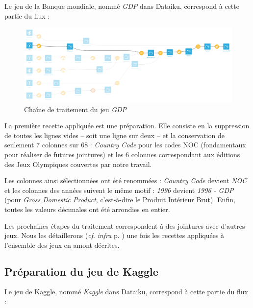 \documentclass[hidelinks, 12pt]{report}
\begin{document}
Le jeu de la Banque mondiale, nommé \textit{GDP} dans Dataiku, correspond à cette partie du flux :

\begin{center}
	\begin{figure}[H]
		\setlength{\belowcaptionskip}{-35pt}
		\includegraphics[scale=0.35]{images/flow-medals-gdp.png}
		\caption{Chaîne de traitement du jeu \textit{GDP}}
	\end{figure}
\end{center}

La première recette appliquée est une préparation. Elle consiste en la suppression de toutes les lignes vides -- soit une ligne sur deux -- et la conservation de seulement 7 colonnes sur 68 : \textit{Country Code} pour les codes NOC (fondamentaux pour réaliser de futures jointures) et les 6 colonnes correspondant aux éditions des Jeux Olympiques couvertes par notre travail.

Les colonnes ainsi sélectionnées ont été renommées : \textit{Country Code} devient \textit{NOC} et les colonnes des années suivent le même motif : \textit{1996} devient \textit{1996 - GDP} (pour \textit{Gross Domestic Product}, c'est-à-dire le Produit Intérieur Brut). Enfin, toutes les valeurs décimales ont été arrondies en entier.

Les prochaines étapes du traitement correspondent à des jointures avec d'autres jeux. Nous les détaillerons (\textit{cf}. \textit{infra} p. \pageref{join}) une fois les recettes appliquées à l'ensemble des jeux en amont décrites.





%





\subsection{Préparation du jeu de Kaggle}

Le jeu de Kaggle, nommé \textit{Kaggle} dans Dataiku, correspond à cette partie du flux :
\end{document}
